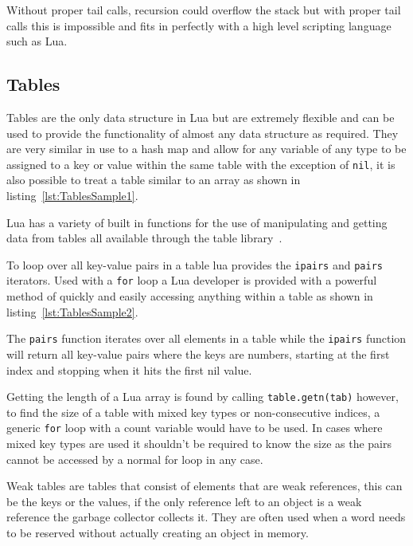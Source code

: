 \documentclass[11pt,a4paper,titlepage]{report}
\begin{document}
	Without proper tail calls, recursion could overflow the stack but with proper tail calls this is impossible and fits in perfectly with a high level scripting language such as Lua.

\subsection{Tables}
	Tables are the only data structure in Lua but are extremely flexible and can be used to provide the functionality of almost any data structure as required. They are very similar in use to a hash map and allow for any variable of any type to be assigned to a key or value within the same table with the exception of \texttt{nil}, it is also possible to treat a table similar to an array as shown in listing~\ref{lst:TablesSample1}.
	

	Lua has a variety of built in functions for the use of manipulating and getting data from tables all available through the table library~\cite{LuaMan}.

	To loop over all key-value pairs in a table lua provides the \texttt{ipairs} and \texttt{pairs} iterators. Used with a \texttt{for} loop a Lua developer is provided with a powerful method of quickly and easily accessing anything within a table as shown in listing~\ref{lst:TablesSample2}.
	

	The \texttt{pairs} function iterates over all elements in a table while the \texttt{ipairs} function will return all key-value pairs where the keys are numbers, starting at the first index and stopping when it hits the first nil value.~\cite{Ierusalimschy:2013:PLT:2502646} 
	
	Getting the length of a Lua array is found by calling \texttt{table.getn(tab)} however, to find the size of a table with mixed key types or non-consecutive indices, a generic \texttt{for} loop with a count variable would have to be used. In cases where mixed key types are used it shouldn't be required to know the size as the pairs cannot be accessed by a normal for loop in any case.

	Weak tables are tables that consist of elements that are weak references, this can be the keys or the values, if the only reference left to an object is a weak reference the garbage collector collects it. They are often used when a word needs to be reserved without actually creating an object in memory.
	
\end{document}
